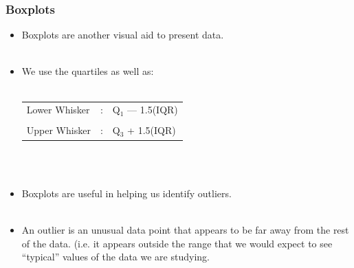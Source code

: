 \documentclass[xcolor=svgnames, compress]{beamer}
\begin{document}
\begin{frame}
\frametitle{Boxplots}

\vspace{-1.0cm}

\begin{itemize}
\justifying
\item	Boxplots are another visual aid to present data.\\
\hfill\\
\item	We use the quartiles as well as:\\
\hfill\\
	\begin{tabular}{lcl}
	Lower Whisker	& : &		Q$_{1}$ --- 1.5(IQR)		\\
	\hfill\\
	Upper Whisker	& : &		Q$_{3}$ + 1.5(IQR)
	\end{tabular}
\hfill\\
\hfill\\
\vspace{0.25cm}
\item	Boxplots are useful in helping us identify \alert{outliers}.\\
\hfill\\
\item An \alert{outlier} is an unusual data point that appears to be far away from the rest of the data.
	(i.e. it appears outside the range that we would expect to see ``typical'' values of the data we are studying. 
\end{itemize}

\end{frame}



\end{document}
